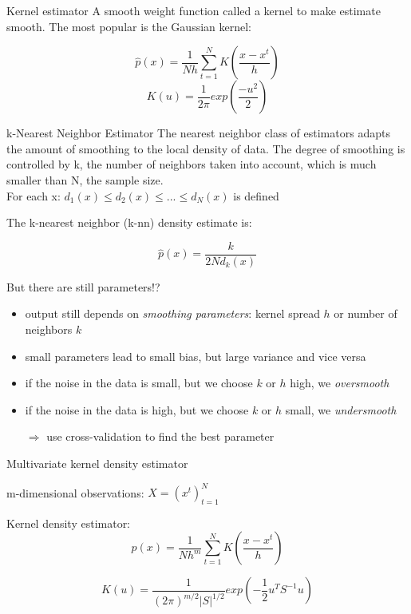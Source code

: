 \documentclass{beamer}
\begin{document}
\begin{frame}[fragile]{Kernel estimator}
A smooth weight function called a kernel to make estimate smooth. 
The most popular is the Gaussian kernel:

	\begin{equation}
		\hat p(x)=\frac{1}{Nh}\sum_{t=1}^{N}K\left( \frac{x-x^t}{h}\right)
	\end{equation}
	\begin{equation}
		K(u)=\frac{1}{2\pi}exp\left(\frac{-u^2}{2}\right)
	\end{equation}    

\end{frame}

\begin{frame}[fragile]{k-Nearest Neighbor Estimator}
The nearest neighbor class of estimators adapts the amount of smoothing
to the local density of data. The degree of smoothing is controlled by k,
the number of neighbors taken into account, which is much smaller than
N, the sample size.\\For each x:  \:  \(  d_{1}(x)\leqslant d_{2}(x)\leqslant  ...\leqslant d_{N}(x)\)\: is defined
  
 The k-nearest neighbor (k-nn) density estimate is:

	\begin{equation}
		\hat p(x)=\frac{k}{2Nd_{k}(x)}
	\end{equation}
   

\end{frame}


\begin{frame}[fragile]{But there are still parameters!?}
  \begin{itemize}
    \item output still depends on \textit{smoothing parameters}: kernel spread $h$ or number of neighbors $k$
    \item small parameters lead to small bias, but large variance and vice versa
    \item if the noise in the data is small, but we choose $k$ or $h$ high, we \textit{oversmooth}
    \item if the noise in the data is high, but we choose $k$ or $h$ small, we \textit{undersmooth}
    \item[$\Rightarrow$] use cross-validation to find the best parameter
  \end{itemize}
\end{frame}


\begin{frame}[fragile]{Multivariate kernel density estimator}


m-dimensional observations:\: \(X=\left(x^{t}\right)^{N}_{t=1}\)

Kernel density estimator:
	\begin{equation}
		\hat p(x)=\frac{1}{Nh^m}\sum_{t=1}^{N}K\left( \frac{x-x^t}{h}\right)
	\end{equation}
	
	\begin{equation}
		K(u)=\frac{1}{\left(2\pi\right)^{m/2}|S|^{1/2}}exp\left(-\frac{1}{2}u^{T}S^{-1}u\right)
	\end{equation} 	
\end{frame}
\end{document}
